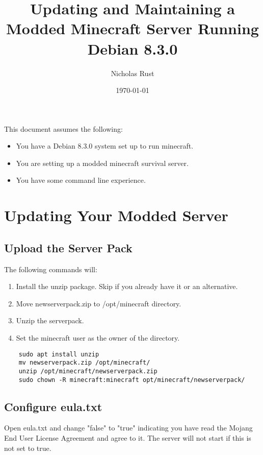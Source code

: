 \documentclass{report}
\title{Updating and Maintaining a Modded Minecraft Server Running Debian 8.3.0}
\author{Nicholas Rust}
\date{\today}
\begin{document}
\maketitle

{\hypersetup{linkcolor=black}
	\centering
	\tableofcontents
}

\pagebreak

This document assumes the following:
\begin{itemize}
	\item You have a Debian 8.3.0 system set up to run minecraft. 
	\item You are setting up a modded minecraft survival server.
	\item You have some command line experience.
\end{itemize}

\chapter{Updating Your Modded Server}

\section{Upload the Server Pack}
The following commands will:
\begin{enumerate}
	\item Install the unzip package. Skip if you already have it or an alternative. 
	\item Move newserverpack.zip to /opt/minecraft directory.
	\item Unzip the serverpack.
	\item Set the minecraft user as the owner of the directory.
\end{enumerate}

\begin{verbatim}
	sudo apt install unzip 
	mv newserverpack.zip /opt/minecraft/
	unzip /opt/minecraft/newserverpack.zip
	sudo chown -R minecraft:minecraft opt/minecraft/newserverpack/
\end{verbatim}

\section{Configure eula.txt}
Open eula.txt and change "false" to "true" indicating you have read the Mojang End User License Agreement and agree to it. The server will not start if this is not set to true.
\end{document}
